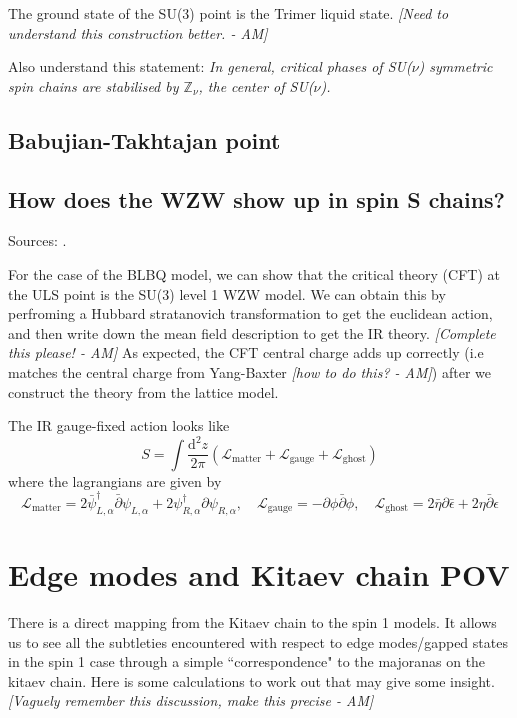 \documentclass{article}
\newcommand\AM[1]{{\it \color{darkblue}  [#1 - AM]}}
\renewcommand{\d}{\mathrm{d}}
\begin{document}
 The ground state of the SU(3) point is the Trimer liquid state. \AM{Need to understand this construction better.} 
 
 Also understand this statement: \emph{In general, critical phases of SU($\nu$) symmetric spin chains are stabilised by $\mathbb{Z}_\nu$, the center of SU($\nu$).}
\subsection{Babujian-Takhtajan point}
\subsection{How does the WZW show up in spin S chains?}
Sources: \cite{Affleck:1987ch, itoi1997extended}.

For the case of the BLBQ model, we can show that the critical theory (CFT) at the ULS point is the  SU(3) level 1 WZW model. We can obtain this by perfroming a Hubbard stratanovich transformation to get the euclidean action, and then write down the mean field description to get the IR theory. \AM{Complete this please!} As expected, the CFT central charge adds up correctly (i.e matches the central charge from Yang-Baxter\AM{how to do this?}) after we construct the theory from the lattice model.

The IR gauge-fixed action looks like
\begin{equation}
    S = \int \frac{\d^2 z}{2\pi} \left(\mathcal{L}_{\text{matter}} + \mathcal{L}_{\text{gauge}} + \mathcal{L}_{\text{ghost}} \right)
\end{equation}
where the lagrangians are given by
\begin{equation}
    \mathcal{L}_{\text{matter}} = 2 \bar{\psi}^{\dagger}_{L, \alpha} \bar{\partial} \psi_{L, \alpha} + 2\psi^{\dagger}_{R, \alpha} \partial \psi_{R, \alpha} ,\quad 
    \mathcal{L}_{\text{gauge}} = -\partial \phi \bar{\partial} \phi,\quad  \mathcal{L}_{\text{ghost}} = 2 \bar{\eta} \partial \bar{\epsilon} + 2 \eta \bar{\partial} \epsilon
\end{equation}
\section{Edge modes and Kitaev chain POV}
There is a direct mapping from the Kitaev chain to the spin 1 models. It allows us to see all the subtleties encountered with respect to edge modes/gapped states in the spin 1 case through a simple ``correspondence" to the majoranas on the kitaev chain. Here is some calculations to work out that may give some insight.\AM{Vaguely remember this discussion, make this precise}
\end{document}
